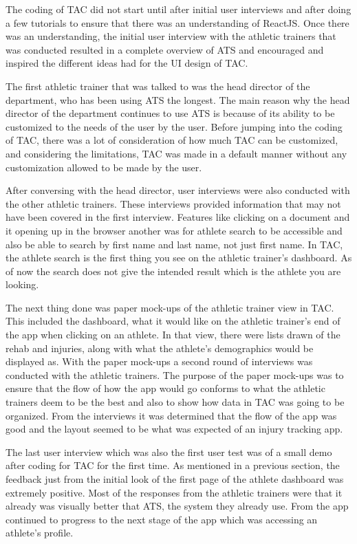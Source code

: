 \documentclass[10pt,twocolumn]{article}
\begin{document}
The coding of TAC did not start until after initial user interviews and after doing a few tutorials to ensure that there was an understanding of ReactJS. Once there was an understanding, the initial user interview with the athletic trainers that was conducted resulted in a complete overview of ATS and encouraged and inspired the different ideas had for the UI design of TAC. 

The first athletic trainer that was talked to was the head director of the department, who has been using ATS the longest. The main reason why the head director of the department continues to use ATS is because of its ability to be customized to the needs of the user by the user. Before jumping into the coding of TAC, there was a lot of consideration of how much TAC can be customized, and considering the limitations, TAC was made in a default manner without any customization allowed to be made by the user. 

After conversing with the head director, user interviews were also conducted with the other athletic trainers. These interviews provided information that may not have been covered in the first interview. Features like clicking on a document and it opening up in the browser another was for athlete search to be accessible and also be able to search by first name and last name, not just first name. In TAC, the athlete search is the first thing you see on the athletic trainer's dashboard. As of now the search does not give the intended result which is the athlete you are looking.

The next thing done was paper mock-ups of the athletic trainer view in TAC. This included the dashboard, what it would like on the athletic trainer's end of the app when clicking on an athlete. In that view, there were lists drawn of the rehab and injuries, along with what the athlete's demographics would be displayed as. With the paper mock-ups a second round of interviews was conducted with the athletic trainers. The purpose of the paper mock-ups was to ensure that the flow of how the app would go conforms to what the athletic trainers deem to be the best and also to show how data in TAC was going to be organized. From the interviews it was determined that the flow of the app was good and the layout seemed to be what was expected of an injury tracking app.

The last user interview which was also the first user test was of a small demo after coding for TAC for the first time. As mentioned in a previous section, the feedback just from the initial look of the first page of the athlete dashboard was extremely positive. Most of the responses from the athletic trainers were that it already was visually better that ATS, the system they already use. From the app continued to progress to the next stage of the app which was accessing an athlete's profile.
\end{document}
